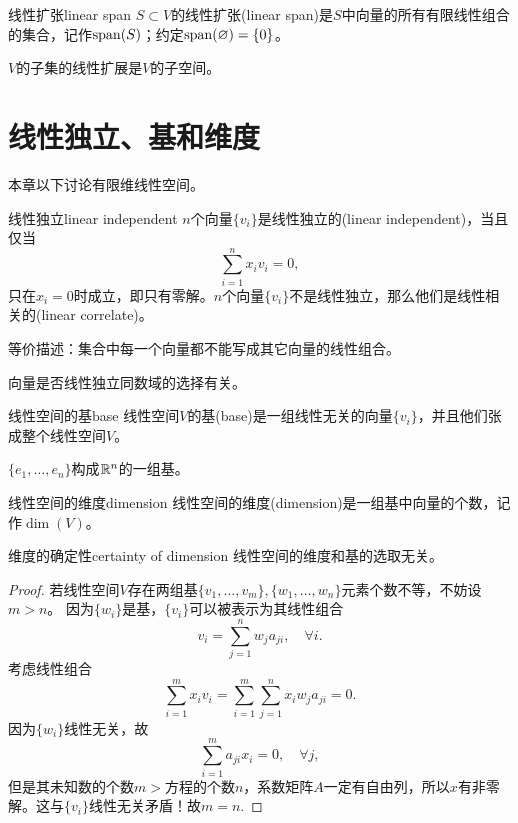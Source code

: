 \begin{definition}{线性扩张}{linear span}
	$S \subset V$的线性扩张(linear span)是$S$中向量的所有有限线性组合的集合，记作$\operatorname{span}(S)$；约定$\operatorname{span}(\varnothing) = \{0\}$。
\end{definition}

\begin{corollary}
	$V$的子集的线性扩展是$V$的子空间。
\end{corollary}

\section{线性独立、基和维度}
本章以下讨论有限维线性空间。
\begin{definition}{线性独立}{linear independent}
	$n$个向量$\{v_i\}$是线性独立的(linear independent)，当且仅当
	\begin{equation}\label{eq:la-linear-independence}
		\sum_{i=1}^nx_iv_i = 0,
	\end{equation}
	只在$x_i = 0$时成立，即只有零解。$n$个向量$\{v_i\}$不是线性独立，那么他们是线性相关的(linear correlate)。
	
	等价描述：集合中每一个向量都不能写成其它向量的线性组合。
\end{definition}
\begin{remark}
	向量是否线性独立同数域的选择有关。
\end{remark}
\begin{definition}{线性空间的基}{base}
	线性空间$V$的基(base)是一组线性无关的向量$\{v_i\}$，并且他们张成整个线性空间$V$。
\end{definition}
\begin{example}
	{}{}
	$\{e_1,\ldots,e_n\}$构成$\mathbb{R}^n$的一组基。
\end{example}
\begin{definition}{线性空间的维度}{dimension}
	线性空间的维度(dimension)是一组基中向量的个数，记作$\dim(V)$。
\end{definition}
\begin{theorem}{维度的确定性}{certainty of dimension}
	线性空间的维度和基的选取无关。
\end{theorem}
\begin{proof}
	若线性空间$V$存在两组基$\{v_1,\ldots,v_m\},\{w_1,\ldots,w_n\}$元素个数不等，不妨设$m > n$。
	因为$\{w_i\}$是基，$\{v_i\}$可以被表示为其线性组合
	\[
		v_i = \sum_{j=1}^nw_ja_{ji},\quad\forall i.
	\]
	考虑线性组合
	\[
		\sum_{i=1}^mx_iv_i = \sum_{i=1}^m\sum_{j=1}^nx_iw_ja_{ji} = 0.
	\]
	因为$\{w_i\}$线性无关，故
	\[
		\sum_{i=1}^ma_{ji}x_i = 0,\quad\forall j,
	\]
	但是其未知数的个数$m >$方程的个数$n$，系数矩阵$A$一定有自由列，所以$x$有非零解。这与$\{v_i\}$线性无关矛盾！故$m = n.$
\end{proof}

